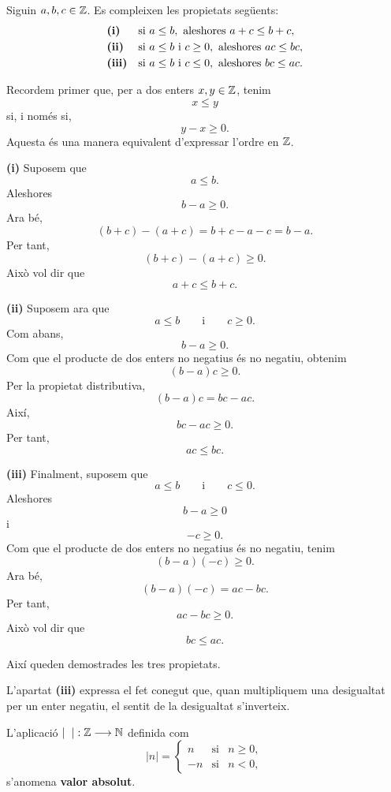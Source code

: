 \begin{proposicio}\label{prop:ordre-operacions-enters}
Siguin $a,b,c\in\mathbb{Z}$. Es compleixen les propietats següents:
\[
\begin{array}{ll}
\text{\textbf{(i)}} & \text{si } a\leq b,\text{ aleshores } a+c\leq b+c,\\[1mm]
\text{\textbf{(ii)}} & \text{si } a\leq b \text{ i } c\geq 0,\text{ aleshores } ac\leq bc,\\[1mm]
\text{\textbf{(iii)}} & \text{si } a\leq b \text{ i } c\leq 0,\text{ aleshores } bc\leq ac.
\end{array}
\]
\end{proposicio}

\begin{prova}
Recordem primer que, per a dos enters $x,y\in\mathbb{Z}$, tenim
\[
x\leq y
\]
si, i només si,
\[
y-x\geq 0.
\]
Aquesta és una manera equivalent d'expressar l'ordre en $\mathbb{Z}$.

\medskip

\noindent\textbf{(i)} Suposem que
\[
a\leq b.
\]
Aleshores
\[
b-a\geq 0.
\]
Ara bé,
\[
(b+c)-(a+c)=b+c-a-c=b-a.
\]
Per tant,
\[
(b+c)-(a+c)\geq 0.
\]
Això vol dir que
\[
a+c\leq b+c.
\]

\medskip

\noindent\textbf{(ii)} Suposem ara que
\[
a\leq b
\qquad\text{i}\qquad
c\geq 0.
\]
Com abans,
\[
b-a\geq 0.
\]
Com que el producte de dos enters no negatius és no negatiu, obtenim
\[
(b-a)c\geq 0.
\]
Per la propietat distributiva,
\[
(b-a)c=bc-ac.
\]
Així,
\[
bc-ac\geq 0.
\]
Per tant,
\[
ac\leq bc.
\]

\medskip

\noindent\textbf{(iii)} Finalment, suposem que
\[
a\leq b
\qquad\text{i}\qquad
c\leq 0.
\]
Aleshores
\[
b-a\geq 0
\]
i
\[
-c\geq 0.
\]
Com que el producte de dos enters no negatius és no negatiu, tenim
\[
(b-a)(-c)\geq 0.
\]
Ara bé,
\[
(b-a)(-c)=ac-bc.
\]
Per tant,
\[
ac-bc\geq 0.
\]
Això vol dir que
\[
bc\leq ac.
\]

Així queden demostrades les tres propietats.
\end{prova}

\begin{observacio}
L'apartat \textbf{(iii)} expressa el fet conegut que, quan multipliquem una desigualtat per un enter negatiu, el sentit de la desigualtat s'inverteix.
\end{observacio}

\begin{definicio}
L'aplicació $|\phantom{n}|:\mathbb{Z}\longrightarrow \mathbb{N}$ definida com
\[
|n|=\left\{
\begin{array}{ccc}
n & \text{si} & n\geq 0,\\
-n & \text{si} & n<0,
\end{array}
\right.
\]
s'anomena \textbf{valor absolut}.
\end{definicio}

